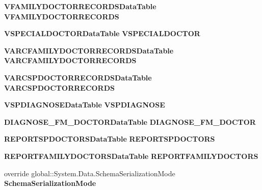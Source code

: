 \begin{CompactItemize}
\item 
{\bf VFAMILYDOCTORRECORDSDataTable} \textbf{VFAMILYDOCTORRECORDS}\hspace{0.3cm}{\tt  [get]}\label{class_automatic_medical_system_1_1_data_set1_2a6293ecc7fa296a1df5597917fe76ad}

\item 
{\bf VSPECIALDOCTORDataTable} \textbf{VSPECIALDOCTOR}\hspace{0.3cm}{\tt  [get]}\label{class_automatic_medical_system_1_1_data_set1_7aa33a5b4123506897989f19c9b3c610}

\item 
{\bf VARCFAMILYDOCTORRECORDSDataTable} \textbf{VARCFAMILYDOCTORRECORDS}\hspace{0.3cm}{\tt  [get]}\label{class_automatic_medical_system_1_1_data_set1_c74be18e645ec36ac62f200f839b951f}

\item 
{\bf VARCSPDOCTORRECORDSDataTable} \textbf{VARCSPDOCTORRECORDS}\hspace{0.3cm}{\tt  [get]}\label{class_automatic_medical_system_1_1_data_set1_e45533ec16b0d738971af36bfbff5ff6}

\item 
{\bf VSPDIAGNOSEDataTable} \textbf{VSPDIAGNOSE}\hspace{0.3cm}{\tt  [get]}\label{class_automatic_medical_system_1_1_data_set1_8cf80a7af33db776da9e93f3f810e987}

\item 
{\bf DIAGNOSE\_\-FM\_\-DOCTORDataTable} \textbf{DIAGNOSE\_\-FM\_\-DOCTOR}\hspace{0.3cm}{\tt  [get]}\label{class_automatic_medical_system_1_1_data_set1_67bfbcba35916d60520fad35cd65e2d5}

\item 
{\bf REPORTSPDOCTORSDataTable} \textbf{REPORTSPDOCTORS}\hspace{0.3cm}{\tt  [get]}\label{class_automatic_medical_system_1_1_data_set1_5b84499e3c895a73745c17e3ceb01ba7}

\item 
{\bf REPORTFAMILYDOCTORSDataTable} \textbf{REPORTFAMILYDOCTORS}\hspace{0.3cm}{\tt  [get]}\label{class_automatic_medical_system_1_1_data_set1_2d12a76d7c4da039b32ac6a16bd9278b}

\item 
override global::System.Data.SchemaSerializationMode \textbf{SchemaSerializationMode}\hspace{0.3cm}{\tt  [get, set]}\label{class_automatic_medical_system_1_1_data_set1_ee96606dc09acdd8dbf9dba73603445c}


\end{CompactItemize}
